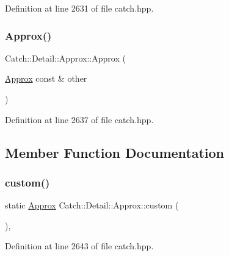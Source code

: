 Definition at line 2631 of file catch.\+hpp.

\hypertarget{class_catch_1_1_detail_1_1_approx_a807330c63266fc914abdf6e461255a54}{}\label{class_catch_1_1_detail_1_1_approx_a807330c63266fc914abdf6e461255a54} 
\subsubsection{\texorpdfstring{Approx()}{Approx()}\hspace{0.1cm}{\footnotesize\ttfamily [2/2]}}
{\footnotesize\ttfamily Catch\+::\+Detail\+::\+Approx\+::\+Approx (\begin{DoxyParamCaption}\item[{\hyperlink{class_catch_1_1_detail_1_1_approx}{Approx} const \&}]{other }\end{DoxyParamCaption})\hspace{0.3cm}{\ttfamily [inline]}}



Definition at line 2637 of file catch.\+hpp.



\subsection{Member Function Documentation}
\hypertarget{class_catch_1_1_detail_1_1_approx_aaf86dc0ee92272ac2d9839197a07951d}{}\label{class_catch_1_1_detail_1_1_approx_aaf86dc0ee92272ac2d9839197a07951d} 
\subsubsection{\texorpdfstring{custom()}{custom()}}
{\footnotesize\ttfamily static \hyperlink{class_catch_1_1_detail_1_1_approx}{Approx} Catch\+::\+Detail\+::\+Approx\+::custom (\begin{DoxyParamCaption}{ }\end{DoxyParamCaption})\hspace{0.3cm}{\ttfamily [inline]}, {\ttfamily [static]}}



Definition at line 2643 of file catch.\+hpp.

\hypertarget{class_catch_1_1_detail_1_1_approx_a05c50c3ad0a971fab19345b5d94979a9}{}\label{class_catch_1_1_detail_1_1_approx_a05c50c3ad0a971fab19345b5d94979a9} 
